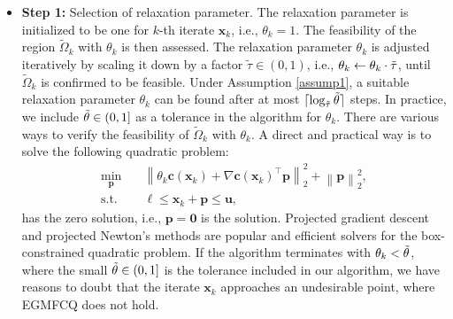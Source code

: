\documentclass[aos]{imsart}
\numberwithin{equation}{section}
\theoremstyle{plain}
\begin{document}
\begin{itemize}
    \item \textbf{Step 1:} Selection of relaxation parameter. The relaxation parameter is initialized to be one for $k$-th iterate $\bm{x}_k$, i.e., $\theta_k = 1$. 
    The feasibility of the region $\widetilde{\Omega}_k$ with $\theta_k$ is then assessed. The relaxation parameter $\theta_k$ is adjusted iteratively by scaling it down by a factor $\tilde{\tau} \in (0,1)$, i.e., $\theta_k \leftarrow \theta_k \cdot \Tilde{\tau}$, until $\widetilde{\Omega}_k$ is confirmed to be feasible. 
    Under Assumption \ref{assump1}, a suitable relaxation parameter $\theta_k$ can be found after at most $\lceil \log_{\Tilde{\tau}} \Tilde{\theta} \rceil$ steps. In practice, we include $\Tilde{\theta} \in (0,1]$ as a tolerance in the algorithm for $\theta_k$. There are various ways to verify the feasibility of $\widetilde{\Omega}_k$ with $\theta_k$. A direct and practical way is to solve the following quadratic problem:
    \begin{equation*}
    \begin{split}
        \min_{\bm{p}} &  \hspace{1em} \left\| \theta_k \bm{c}(\bm{x}_k)+\nabla \bm{c}(\bm{x}_k)^{\top}\bm{p} \right\|_2^2 + \left\| \bm{p} \right\|_2^2,\\
        \text{s.t.} & \hspace{1em} \bm{\ell} \leq \bm{x}_k + \bm{p} \leq \bm{u},
    \end{split}
    \end{equation*}
    has the zero solution, i.e., $\bm{p} = \bm{0}$ is the solution. Projected gradient descent and projected Newton's methods are popular and efficient solvers for the box-constrained quadratic problem. If the algorithm terminates with $\theta_k < \Tilde{\theta}$, where the small $\Tilde{\theta} \in (0,1]$ is the tolerance included in our algorithm, we have reasons to doubt that the iterate $\bm{x}_k$ approaches an undesirable point, where EGMFCQ does not hold. 


\end{itemize}
\end{document}
